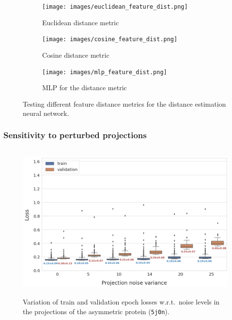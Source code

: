 \begin{figure}
    \centering
    \begin{subfigure}[b]{0.25\textwidth}
        \texttt{[image: images/euclidean\_feature\_dist.png]}
        \caption{Euclidean distance metric}
    \end{subfigure}
    \hfill
    \begin{subfigure}[b]{0.25\textwidth}
    \centering
        \texttt{[image: images/cosine\_feature\_dist.png]}
        \caption{Cosine distance metric}
    \end{subfigure}
    \hfill
    \begin{subfigure}[b]{0.25\textwidth}
    \centering
        \texttt{[image: images/mlp\_feature\_dist.png]}
        \caption{MLP for the distance metric}
    \end{subfigure}
    \caption{Testing different feature distance metrics for the distance estimation neural network.}
    \label{fig:orientation-recovery-loss}
\end{figure}

\subsubsection{Sensitivity to perturbed projections}\label{sec:results:distance-estimation:sensitivity}


\begin{figure}
    \centering
        \includegraphics[height=8cm]{images/de_noises_nums.png}
        \caption{%
            Variation of train and validation epoch losses w.r.t.\ noise levels in the projections of the asymmetric protein (\texttt{5j0n}).
        }\label{fig:distance-estimation-vary-projection-noise}
\end{figure}

